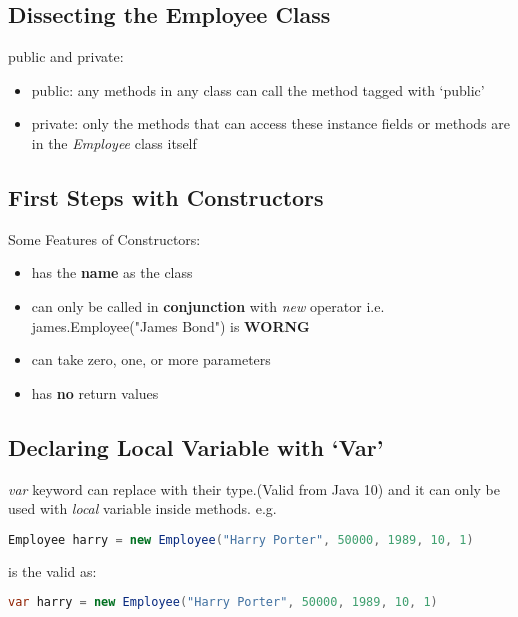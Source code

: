 \documentclass[12pt]{article}
\begin{document}
\subsection{Dissecting the Employee Class}
public and private:
\begin{itemize}
    \item public: any methods in any class can call the method tagged with `public'
    \item private: only the methods that can access these instance fields or methods are in the \textit{Employee} class itself
\end{itemize}

\subsection{First Steps with Constructors}
Some Features of Constructors:
\begin{itemize}
    \item has the \textbf{name} as the class
    \item can only be called in \textbf{conjunction} with \emph{new} operator\newline
    i.e. james.Employee("James Bond") is \textbf{WORNG}
    \item can take zero, one, or more parameters
    \item has \textbf{no} return values
\end{itemize}

\subsection{Declaring Local Variable with `Var'}
\emph{var} keyword can replace with their type.(Valid from Java 10)
and it can only be used with \emph{local} variable inside methods.\newline
e.g.
\begin{lstlisting}[language=Java]
Employee harry = new Employee("Harry Porter", 50000, 1989, 10, 1)
\end{lstlisting}
is the valid as:
\begin{lstlisting}[language=Java]
var harry = new Employee("Harry Porter", 50000, 1989, 10, 1)
\end{lstlisting}
\end{document}
